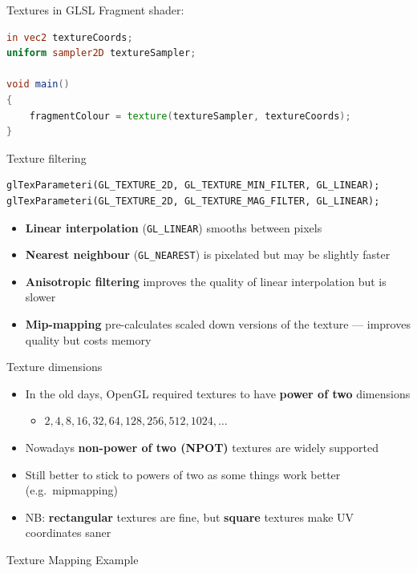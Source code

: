 
\begin{frame}[fragile]{Textures in GLSL}
	Fragment shader:
	
	\begin{lstlisting}[language=GLSL]
in vec2 textureCoords;
uniform sampler2D textureSampler;

void main()
{
    fragmentColour = texture(textureSampler, textureCoords);
}
	\end{lstlisting}
\end{frame}

\begin{frame}[fragile]{Texture filtering}
	\pause
	\begin{lstlisting}
glTexParameteri(GL_TEXTURE_2D, GL_TEXTURE_MIN_FILTER, GL_LINEAR);
glTexParameteri(GL_TEXTURE_2D, GL_TEXTURE_MAG_FILTER, GL_LINEAR);
	\end{lstlisting}
	\begin{itemize}
		\item \textbf{Linear interpolation} (\lstinline{GL_LINEAR})
			smooths between pixels
		\pause\item \textbf{Nearest neighbour} (\lstinline{GL_NEAREST})
			is pixelated but may be slightly faster
		\pause\item \textbf{Anisotropic filtering} improves the quality of linear interpolation
			but is slower
		\pause\item \textbf{Mip-mapping} pre-calculates scaled down versions of the texture ---
			improves quality but costs memory
	\end{itemize}
\end{frame}

\begin{frame}{Texture dimensions}
	\begin{itemize}
		\item In the old days, OpenGL required textures to have \textbf{power of two} dimensions
			\begin{itemize}
				\pause\item $2, 4, 8, 16, 32, 64, 128, 256, 512, 1024, \dots$
			\end{itemize}
		\pause\item Nowadays \textbf{non-power of two (NPOT)} textures are widely supported
		\pause\item Still better to stick to powers of two as some things work better (e.g.\ mipmapping)
		\pause\item NB: \textbf{rectangular} textures are fine, but \textbf{square} textures make UV coordinates saner
	\end{itemize}
\end{frame}

\begin{frame}
	\begin{center}
		Texture Mapping Example
	\end{center}
\end{frame}
